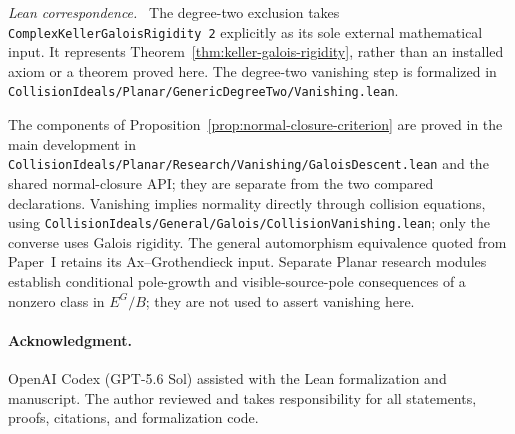 \documentclass[11pt]{article}
\newcommand{\leanpath}[1]{\texttt{\nolinkurl{#1}}}
\newenvironment{leanfiles}
  {\par\medskip\begingroup\footnotesize\raggedright\noindent
   \textit{Lean correspondence.}\ }
  {\par\endgroup\medskip}
\begin{document}
\begin{leanfiles}
The degree-two exclusion takes
\texttt{ComplexKellerGaloisRigidity 2} explicitly as its sole external
mathematical input.  It represents
Theorem~\ref{thm:keller-galois-rigidity}, rather than an installed axiom or
a theorem proved here.  The degree-two vanishing step is formalized in
\leanpath{CollisionIdeals/Planar/GenericDegreeTwo/Vanishing.lean}.

The components of Proposition~\ref{prop:normal-closure-criterion} are proved
in the main development in
\leanpath{CollisionIdeals/Planar/Research/Vanishing/GaloisDescent.lean}
and the shared normal-closure API; they are separate from the two compared
declarations.  Vanishing implies normality directly through collision
equations, using
\leanpath{CollisionIdeals/General/Galois/CollisionVanishing.lean};
only the converse uses Galois rigidity.  The general automorphism
equivalence quoted from Paper~I retains its Ax--Grothendieck input.
Separate Planar research modules establish conditional pole-growth and
visible-source-pole consequences of a nonzero class in \(E^G/B\); they
are not used to assert vanishing here.
\end{leanfiles}

\paragraph{Acknowledgment.}
OpenAI Codex (GPT-5.6 Sol) assisted with the Lean formalization and
manuscript.  The author reviewed and takes responsibility for all
statements, proofs, citations, and formalization code.

\begingroup
\raggedright


\endgroup
\end{document}
